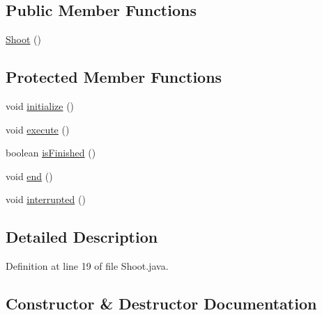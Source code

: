 \subsection*{Public Member Functions}
\begin{DoxyCompactItemize}
\item 
\mbox{\hyperlink{classorg_1_1usfirst_1_1frc3707_1_1_creedence_1_1commands_1_1_shoot_aada90ff0b512d0e08112c94c52428dbb}{Shoot}} ()
\end{DoxyCompactItemize}
\subsection*{Protected Member Functions}
\begin{DoxyCompactItemize}
\item 
void \mbox{\hyperlink{classorg_1_1usfirst_1_1frc3707_1_1_creedence_1_1commands_1_1_shoot_a2caa6be9124c672dc1ac9dc3d0fbf990}{initialize}} ()
\item 
void \mbox{\hyperlink{classorg_1_1usfirst_1_1frc3707_1_1_creedence_1_1commands_1_1_shoot_ae209a5489db7533dd2dd72ee75414b69}{execute}} ()
\item 
boolean \mbox{\hyperlink{classorg_1_1usfirst_1_1frc3707_1_1_creedence_1_1commands_1_1_shoot_ac5a292972768da551c157ca39dab4091}{is\+Finished}} ()
\item 
void \mbox{\hyperlink{classorg_1_1usfirst_1_1frc3707_1_1_creedence_1_1commands_1_1_shoot_a1d165433b14250628f8f0abbcfa7fad4}{end}} ()
\item 
void \mbox{\hyperlink{classorg_1_1usfirst_1_1frc3707_1_1_creedence_1_1commands_1_1_shoot_af0c6121ca1b92d6b7ad220c84019f140}{interrupted}} ()
\end{DoxyCompactItemize}


\subsection{Detailed Description}


Definition at line 19 of file Shoot.\+java.



\subsection{Constructor \& Destructor Documentation}
\mbox{\label{classorg_1_1usfirst_1_1frc3707_1_1_creedence_1_1commands_1_1_shoot_aada90ff0b512d0e08112c94c52428dbb}} 
